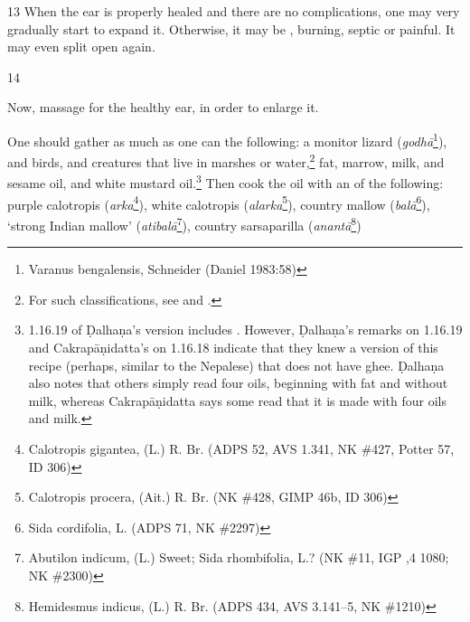 \begin{translation}
    \item[13] When the ear is properly healed and there are no complications,  one may
    very gradually start to expand it.  Otherwise, it may be ,
    burning, septic or painful.  It may even split open again.
    
    
    \item [14]
    
    
    Now, massage for the healthy ear, in order to enlarge it. 
    
    \newcommand{\animal}[4]{#1 (\emph{#2}\footnote{#3 (#4)})}
    \newcommand{\plant}[4]{#1 (\emph{#2}\footnote{#3 (#4)})}
    \newcommand\skt[2]{#1 (#2)}
    
    One should gather as much as one can the following: a
    \animal{monitor lizard}{godhā}{Varanus bengalensis, Schneider}{Daniel
        1983:58},
     and  birds, and
    creatures that live in marshes or water,\footnote{For such classifications,
    see \citet{zimm-1999} and \citet{smit-1994}.} fat, marrow, milk, and sesame oil, and
    white mustard oil.\footnote{1.16.19 of Ḍalhaṇa's version \citep[79]{vulgate} includes . However, Ḍalhaṇa's remarks on 1.16.19 and Cakrapāṇidatta's on 1.16.18 \citep[130]{acar-1939} indicate that they knew a version of this recipe  (perhaps, similar to the Nepalese) that does not have ghee. Ḍalhaṇa also notes that others simply read four oils, beginning with fat and without milk, whereas Cakrapāṇidatta says some read that it is made with four oils and milk.} %
Then cook the oil with an  of the following:
    \plant{purple calotropis}{arka}{Calotropis gigantea, (L.) R. Br.}{ADPS 52, AVS
        1.341, NK \#427, Potter 57, ID 306},
    \plant{white calotropis}{alarka}{Calotropis procera, (Ait.) R. Br.}{NK
        \#428, GIMP 46b, ID 306},
    \plant{country mallow}{balā}{Sida cordifolia, L.}{ADPS 71, NK \#2297},
    \plant{`strong Indian mallow'}{atibalā}{Abutilon indicum, (L.) Sweet; Sida
        rhombifolia, L.?}{NK \#11, IGP ,4 1080; NK \#2300},
    \plant{country sarsaparilla}{anantā}{Hemidesmus indicus, (L.) R. Br.}{ADPS 434,
        AVS 3.141--5, NK \#1210}

\end{translation}
